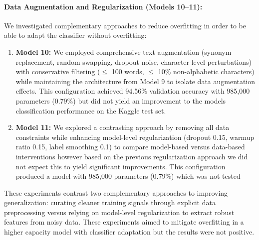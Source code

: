 \documentclass[letterpaper]{article}
\begin{document}
\paragraph{Data Augmentation and Regularization (Models 10--11):} We investigated complementary approaches to reduce overfitting in order to be able to adapt the classifier without overfitting:
\begin{enumerate}
    \item \textbf{Model 10:} We employed comprehensive text augmentation (synonym replacement, random swapping, dropout noise, character-level perturbations) with conservative filtering ($\leq$ 100 words, $\leq$ 10\% non-alphabetic characters) while maintaining the architecture from Model 9 to isolate data augmentation effects. This configuration achieved 94.56\% validation accuracy with 985,000 parameters (0.79\%) but did not yield an improvement to the models classification performance on the Kaggle test set.
    
    \item \textbf{Model 11:} We explored a contrasting approach by removing all data constraints while enhancing model-level regularization (dropout 0.15, warmup ratio 0.15, label smoothing 0.1) to compare model-based versus data-based interventions however based on the previous regularization approach we did not expect this to yield significant improvements. This configuration produced a model with 985,000 parameters (0.79\%) which was not tested
\end{enumerate}

These experiments contrast two complementary approaches to improving generalization: curating cleaner training signals through explicit data preprocessing versus relying on model-level regularization to extract robust features from noisy data. These experiments aimed to mitigate overfitting in a higher capacity model with classifier adaptation but the results were not positive.
\end{document}

